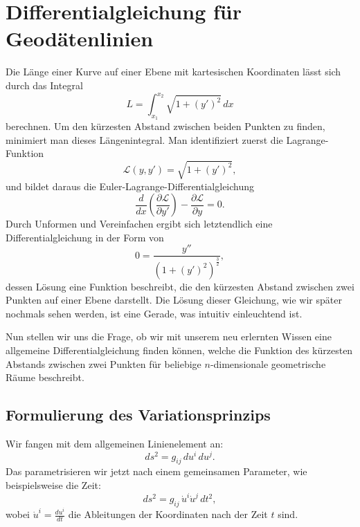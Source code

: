 %
%
%
%
\section{Differentialgleichung für Geodätenlinien
\label{geodaeten:section:Standardverfahren}}

Die Länge einer Kurve auf einer Ebene mit kartesischen Koordinaten lässt sich durch das Integral
\begin{equation}
	L = \int_{x_1}^{x_2} \sqrt{1 + \left(y'\right)^2} \, dx
\end{equation}
berechnen.
Um den kürzesten Abstand zwischen beiden Punkten zu finden, minimiert man dieses Längenintegral.
Man identifiziert zuerst die Lagrange-Funktion
\begin{equation}
	\mathcal{L}(y, y') = \sqrt{1 + \left(y'\right)^2},
\end{equation}
und bildet daraus die Euler-Lagrange-Differentialgleichung
\begin{equation}
	\frac{d}{dx} \left(\frac{\partial \mathcal{L}}{\partial y'}\right) - \frac{\partial \mathcal{L}}{\partial y} = 0.
\end{equation}
Durch Unformen und Vereinfachen ergibt sich letztendlich eine Differentialgleichung in der Form von
\begin{equation}
	0 = \frac{y''}{\left(1 + \left(y'\right)^2\right)^{\frac{3}{2}}},
\end{equation}
dessen Lösung eine Funktion beschreibt, die den kürzesten Abstand zwischen zwei Punkten auf einer Ebene darstellt. Die Lösung dieser Gleichung, wie wir später nochmals sehen werden, ist eine Gerade, was intuitiv einleuchtend ist.

Nun stellen wir uns die Frage, ob wir mit unserem neu erlernten Wissen eine allgemeine Differentialgleichung finden können, welche die Funktion des kürzesten Abstands zwischen zwei Punkten für beliebige $n$-dimensionale geometrische Räume beschreibt.

\subsection{Formulierung des Variationsprinzips}
Wir fangen mit dem allgemeinen Linienelement an:
\begin{equation}
	ds^2 = g_{ij} \, du^i \, du^j.
\end{equation}
Das parametrisieren wir jetzt nach einem gemeinsamen Parameter, wie beispielsweise die Zeit:
\begin{equation}
	ds^2 = g_{ij} \, \dot{u}^i \dot{u}^j \, dt^2,
\end{equation}
wobei $\dot{u}^i = \frac{du^i}{dt}$ die Ableitungen der Koordinaten nach der Zeit $t$ sind.


